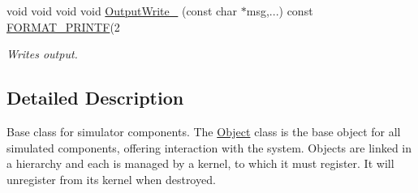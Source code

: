 \begin{DoxyCompactItemize}
void void void void \hyperlink{class_simulator_1_1_object_aa4c349662bbc5f0a9c53a2f61d4731d1}{Output\+Write\+\_\+} (const char $\ast$msg,...) const \hyperlink{types_8h_ab2def27d383f13e3b829472479dcf856}{F\+O\+R\+M\+A\+T\+\_\+\+P\+R\+I\+N\+T\+F}(2
\begin{DoxyCompactList}\small\item\em Writes output. \end{DoxyCompactList}\end{DoxyCompactItemize}


\subsection{Detailed Description}
Base class for simulator components. The \hyperlink{class_simulator_1_1_object}{Object} class is the base object for all simulated components, offering interaction with the system. Objects are linked in a hierarchy and each is managed by a kernel, to which it must register. It will unregister from its kernel when destroyed. 

